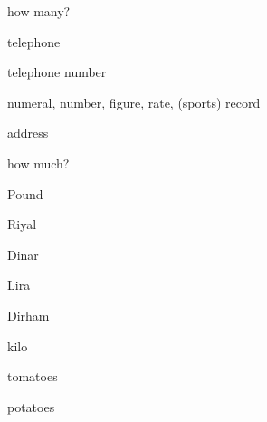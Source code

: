 \begin{flashcard}{\LARGE how many?}
\LARGE {}
\end{flashcard}
\begin{flashcard}{\LARGE telephone}
\LARGE {}
\end{flashcard}
\begin{flashcard}{\LARGE telephone number}
\LARGE {}
\end{flashcard}
\begin{flashcard}{\LARGE numeral, number, figure, rate, (sports) record}
\LARGE {}
\end{flashcard}
\begin{flashcard}{\LARGE address}
\LARGE {}
\end{flashcard}
\begin{flashcard}{\LARGE how much?}
\LARGE {}
\end{flashcard}
\begin{flashcard}{\LARGE Pound}
\LARGE {}
\end{flashcard}
\begin{flashcard}{\LARGE Riyal}
\LARGE {}
\end{flashcard}
\begin{flashcard}{\LARGE Dinar}
\LARGE {}
\end{flashcard}
\begin{flashcard}{\LARGE Lira}
\LARGE {}
\end{flashcard}
\begin{flashcard}{\LARGE Dirham}
\LARGE {}
\end{flashcard}
\begin{flashcard}{\LARGE kilo}
\LARGE {}
\end{flashcard}
\begin{flashcard}{\LARGE tomatoes}
\LARGE {}
\end{flashcard}
\begin{flashcard}{\LARGE potatoes}
\LARGE {}
\end{flashcard}
